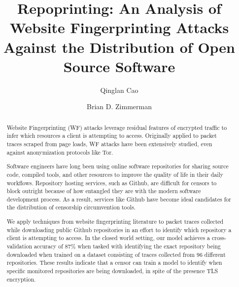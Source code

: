 \documentclass[sigconf,authorversion,nonacm]{acmart}
\begin{document}
\title{Repoprinting: An Analysis of Website Fingerprinting Attacks Against the Distribution of Open Source Software}

\author{Qinglan Cao}

\author{Brian D. Zimmerman}


\renewcommand{\shortauthors}{Cao and Zimmerman, et al.}

\begin{abstract}
Website Fingerprinting (WF) attacks leverage residual features of encrypted traffic to infer which resources a client is attempting to access. Originally applied to packet traces scraped from page loads, WF attacks have been extensively studied, even against anonymization protocols like Tor.

Software engineers have long been using online software repositories for sharing source code, compiled tools, and other resources to improve the quality of life in their daily workflows. Repository hosting services, such as Github, are difficult for censors to block outright because of how entangled they are with the modern software development process. As a result, services like Github have become ideal candidates for the distribution of censorship circumvention tools.

We apply techniques from website fingerprinting literature to packet traces collected while downloading public Github repositories in an effort to identify which repository a client is attempting to access. In the closed world setting, our model achieves a cross-validation accuracy of 87\% when tasked with identifying the exact repository being downloaded when trained on a dataset consisting of traces collected from 96 different repositories. These results indicate that a censor can train a model to identify when specific monitored repositories are being downloaded, in spite of the presence TLS encryption.




\end{abstract}
\end{document}
